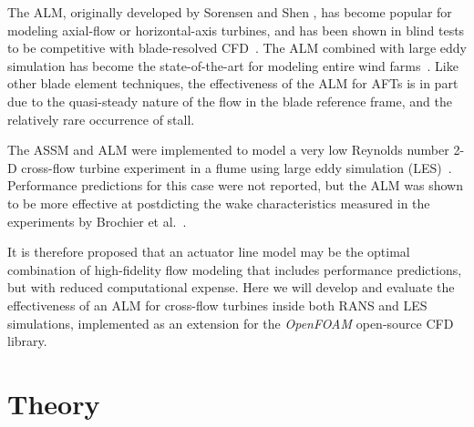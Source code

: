 The ALM, originally developed by Sorensen and Shen \cite{Sorensen2002}, has
become popular for modeling axial-flow or horizontal-axis turbines, and has been
shown in blind tests to be competitive with blade-resolved
CFD~\cite{Krogstad2013, Pierella2014}. The ALM combined with large eddy
simulation has become the state-of-the-art for modeling entire wind
farms~\cite{Archer2013, Churchfield2012, Sorensen2015, Fleming2013,
    Fleming2014}. Like other blade element techniques, the effectiveness of the ALM
for AFTs is in part due to the quasi-steady nature of the flow in the blade
reference frame, and the relatively rare occurrence of stall.

The ASSM and ALM were implemented to model a very low Reynolds number 2-D
cross-flow turbine experiment in a flume using large eddy simulation
(LES)~\cite{Shamsoddin2014}. Performance predictions for this case were not
reported, but the ALM was shown to be more effective at postdicting the wake
characteristics measured in the experiments by Brochier et
al.~\cite{Brochier1986}.

It is therefore proposed that an actuator line model may be the optimal
combination of high-fidelity flow modeling that includes performance
predictions, but with reduced computational expense. Here we will develop and
evaluate the effectiveness of an ALM for cross-flow turbines inside both RANS
and LES simulations, implemented as an extension for the \textit{OpenFOAM}
open-source CFD library.


\section{Theory}

